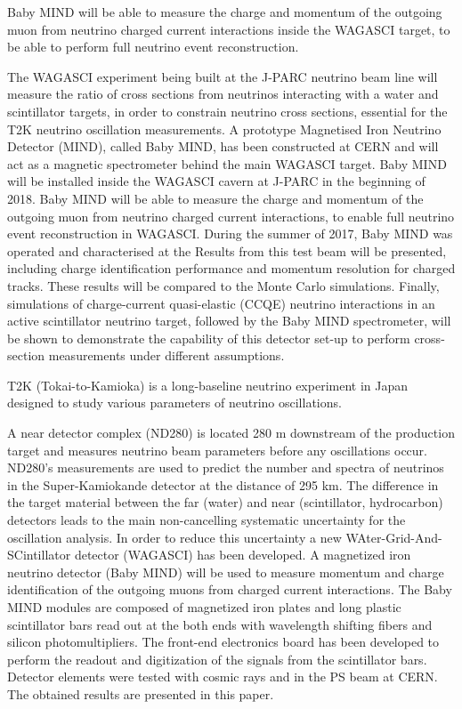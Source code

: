 Baby MIND will be able to measure the charge and momentum of the outgoing muon from neutrino charged current interactions inside the WAGASCI target, to be able to perform full neutrino event reconstruction.


The WAGASCI experiment being built at the J-PARC neutrino beam line will measure the ratio of cross sections from neutrinos interacting with a water and scintillator targets, in order to constrain neutrino cross sections, essential for the T2K neutrino oscillation measurements. 
A prototype Magnetised Iron Neutrino Detector (MIND), called Baby MIND, has been constructed at CERN and will act as a magnetic spectrometer behind the main WAGASCI target. 
Baby MIND will be installed inside the WAGASCI cavern at J-PARC in the beginning of 2018. Baby MIND will be able to measure the charge and momentum of the outgoing muon from neutrino charged current interactions, to enable full neutrino event reconstruction in WAGASCI.
During the summer of 2017, Baby MIND was operated and characterised at the 
Results from this test beam will be presented, including charge identification performance and momentum resolution for charged tracks. These results will be compared to the Monte Carlo simulations. 
Finally, simulations of charge-current quasi-elastic (CCQE) neutrino interactions in an active scintillator neutrino target, followed by the Baby MIND spectrometer, will be shown to demonstrate the capability of this detector set-up to perform cross-section measurements under different assumptions.


T2K (Tokai-to-Kamioka) is a long-baseline neutrino experiment in Japan designed to study various parameters of neutrino oscillations. 

A near detector complex (ND280) is located 280 m downstream of the production target and measures neutrino beam parameters before any oscillations occur.
 ND280's measurements are used to predict the number and spectra of neutrinos in the Super-Kamiokande detector at the distance of 295 km. 
 The difference in the target material between the far (water) and near (scintillator, hydrocarbon) detectors leads to the main non-cancelling systematic uncertainty for the oscillation analysis. 
 In order to reduce this uncertainty a new WAter-Grid-And-SCintillator detector (WAGASCI) has been developed. 
 A magnetized iron neutrino detector (Baby MIND) will be used to measure momentum and charge identification of the outgoing muons from charged current interactions. 
 The Baby MIND modules are composed of magnetized iron plates and long plastic scintillator bars read out at the both ends with wavelength shifting fibers and silicon photomultipliers. 
 The front-end electronics board has been developed to perform the readout and digitization of the signals from the scintillator bars. Detector elements were tested with cosmic rays and in the PS beam at CERN. 
 The obtained results are presented in this paper.


